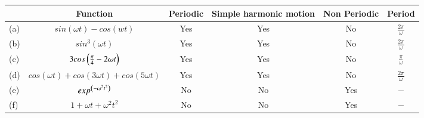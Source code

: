 \begin{tabular}{|l|c|c|c|c|c|}
  \hline
  &\textbf{Function}&\textbf{Periodic } &\textbf{Simple harmonic motion}&\textbf{Non Periodic}&\textbf{Period} \\\hline
  (a) & $sin(\omega t)-cos(wt)$ & Yes & Yes & No & $\frac{2\pi}{\omega}$ \\\hline
  (b) & $sin^3(\omega t)$  & Yes & Yes & No & $\frac{2\pi}{\omega}$\\\hline
  (c) & $3cos\left(\frac{\pi}{4}-2\omega t\right)$ & Yes & Yes & No & $\frac{\pi}{\omega}$\\\hline
  (d) & $cos(\omega t)+cos(3\omega t)+cos(5\omega t)$ & Yes & Yes & No & $\frac{2\pi}{\omega}$\\\hline
  (e) & $exp^{\left(-\omega^2t^2\right)}$ & No & No & Yes & $-$ \\\hline
  (f) &$ 1+\omega t+\omega ^2t^2$ & No & No & Yes & $-$ \\\hline
 \end{tabular}
